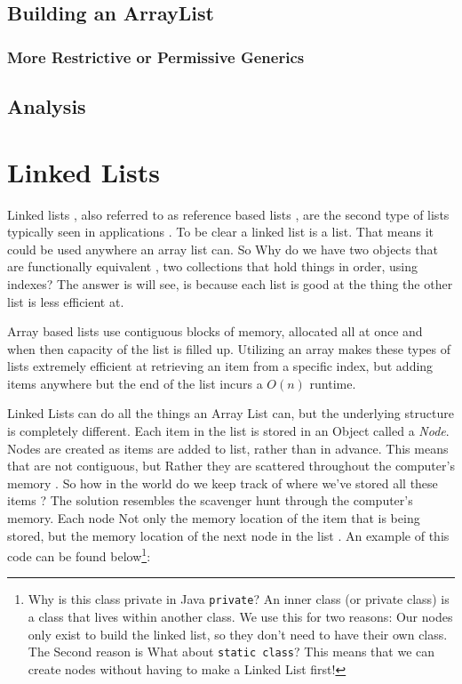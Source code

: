 \section{Building an ArrayList}
\label{buildingArraylist}

\subsection{More Restrictive or Permissive Generics}

\section{Analysis}
\chapter{Linked Lists}
Linked lists , also referred to as reference based lists , are the second type of lists typically seen in applications . To be clear a linked list is a list. That means it could be used anywhere an array list can.   So Why do we have two objects that are functionally equivalent , two collections that hold things in order, using indexes?  The answer is will see, is because each list is good at the thing the other list is less efficient at.


Array based lists use contiguous blocks of memory, allocated all at once and when then capacity of the list is filled up.  Utilizing an array makes these types of lists extremely efficient at retrieving an item from a specific index, but adding items anywhere but the end of the list incurs a $O(n)$ runtime.



Linked Lists can do all the things an Array List can, but the underlying structure is completely different.  
Each item in the list is stored in an Object called a \textit{Node}.  Nodes are created as items are added to list, rather than in advance.  This means that are not contiguous, but Rather they are scattered throughout the computer's memory . So how in the world do we keep track of where we've stored all these items ? The solution resembles the scavenger hunt through the computer's memory.  Each node Not only the memory location of the item that is being stored, but the memory location of the next node in the list . An example of this code can be found below\footnote{Why is this class private in Java \texttt{private}? An inner class  (or private class) is a class that lives within another class.  We use this for two reasons:  Our nodes only exist to build the linked list, so they don't need to have their own class.  The Second reason is   What about \texttt{static class}? This means that we can create nodes without having to make a Linked List first! }: %

